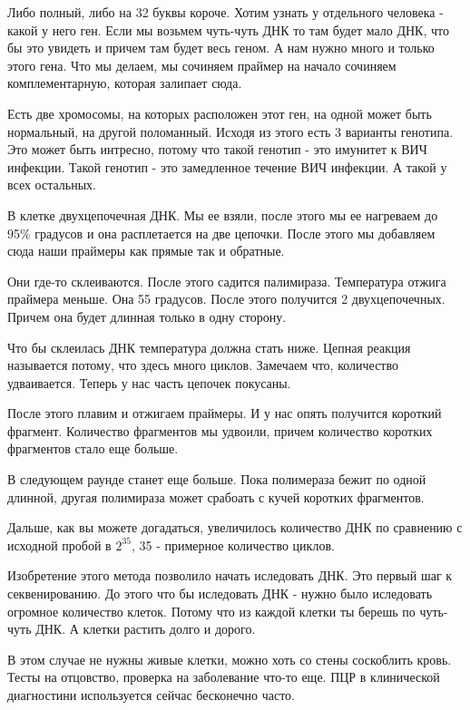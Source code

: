 Либо полный, либо на 32 буквы короче. Хотим узнать у отдельного человека - какой у него ген. 
Если мы возьмем чуть-чуть ДНК то там будет мало ДНК, что бы это увидеть и причем там будет весь геном. 
А нам нужно много и только этого гена. 
Что мы делаем, мы сочиняем праймер на начало сочиняем комплементарную, которая залипает сюда. 

Есть две хромосомы, на которых расположен этот ген, на одной может быть нормальный, на другой 
поломанный. Исходя из этого есть 3 варианты генотипа. Это может быть интресно, потому что 
такой генотип - это имунитет к ВИЧ инфекции. Такой генотип - это замедленное течение 
ВИЧ инфекции. А такой у всех остальных. 
                                             
В клетке двухцепочечная ДНК. Мы ее взяли, после этого 
мы ее нагреваем до 95\% градусов и она расплетается на две цепочки. 
После этого мы добавляем сюда наши праймеры как прямые так и обратные. 

Они где-то склеиваются. После этого садится палимираза. Температура отжига 
праймера меньше. Она 55 градусов. После этого получится 2 двухцепочечных. 
Причем она будет длинная только в одну сторону. 

Что бы склеилась ДНК температура должна стать ниже. 
Цепная реакция называется потому, что здесь много циклов. Замечаем что, 
количество удваивается. Теперь 
у нас часть цепочек покусаны. 

После этого плавим и отжигаем праймеры. 
И у нас опять получится короткий фрагмент. Количество 
фрагментов мы удвоили, причем количество коротких
фрагментов стало еще больше. 

В следующем раунде станет еще больше. Пока полимераза бежит по одной длинной, 
другая полимираза может срабоать с кучей коротких фрагментов. 

Дальше, как вы можете догадаться, увеличилось количество ДНК по 
сравнению с исходной пробой в $2^{35}$, 35 - примерное количество циклов. 

Изобретение этого метода позволило начать иследовать ДНК. Это 
первый шаг к секвенированию. До этого что бы 
иследовать ДНК - нужно было иследовать 
огромное количество клеток. Потому что из 
каждой клетки ты берешь по чуть-чуть ДНК. 
А клетки растить долго и дорого. 

В этом случае не нужны живые клетки, можно хоть 
со стены соскоблить кровь. Тесты на отцовство, проверка на 
заболевание что-то еще. ПЦР в клинической диагностини 
используется сейчас бесконечно часто. 

